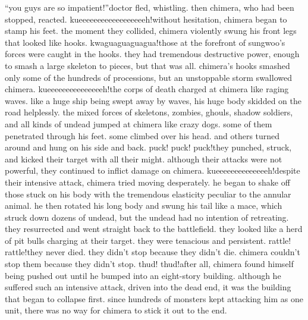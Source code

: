 “you guys are so impatient!”doctor fled, whistling.
then chimera, who had been stopped, reacted.
kueeeeeeeeeeeeeeeeeeh!without hesitation, chimera began to stamp his feet.
 the moment they collided, chimera violently swung his front legs that looked like hooks.
kwaguaguaguagua!those at the forefront of sungwoo’s forces were caught in the hooks.
 they had tremendous destructive power, enough to smash a large skeleton to pieces, but that was all.
 chimera’s hooks smashed only some of the hundreds of processions, but an unstoppable storm swallowed chimera.
kueeeeeeeeeeeeeeeh!the corps of death charged at chimera like raging waves.
 like a huge ship being swept away by waves, his huge body skidded on the road helplessly.
the mixed forces of skeletons, zombies, ghouls, shadow soldiers, and all kinds of undead jumped at chimera like crazy dogs.
some of them penetrated through his feet.
 some climbed over his head.
 and others turned around and hung on his side and back.
puck! puck! puck!they punched, struck, and kicked their target with all their might.
 although their attacks were not powerful, they continued to inflict damage on chimera.
kueeeeeeeeeeeeeeh!despite their intensive attack, chimera tried moving desperately.
 he began to shake off those stuck on his body with the tremendous elasticity peculiar to the annular animal.
he then rotated his long body and swung his tail like a mace, which struck down dozens of undead, but the undead had no intention of retreating.
 they resurrected and went straight back to the battlefield.
 they looked like a herd of pit bulls charging at their target.
 they were tenacious and persistent.
rattle! rattle!they never died.
 they didn’t stop because they didn’t die.
 chimera couldn’t stop them because they didn’t stop.
thud! thud!after all, chimera found himself being pushed out until he bumped into an eight-story building.
although he suffered such an intensive attack, driven into the dead end, it was the building that began to collapse first.
since hundreds of monsters kept attacking him as one unit, there was no way for chimera to stick it out to the end.


 